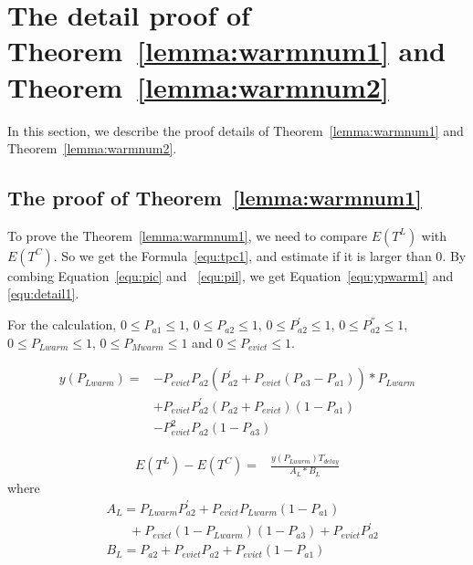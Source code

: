 \newpage
\section{The detail proof of Theorem~\ref{lemma:warmnum1} and Theorem~\ref{lemma:warmnum2}}
\label{appendixa}
In this section, we describe the proof details of Theorem~\ref{lemma:warmnum1} and Theorem~\ref{lemma:warmnum2}.


\subsection{The proof of Theorem~\ref{lemma:warmnum1}}
To prove the Theorem~\ref{lemma:warmnum1}, we need to compare $E(T^{L})$ with $E(T^{C})$.
So we get the Formula~\ref{equ:tpc1}, and estimate if it is larger than $0$.
By combing Equation~\ref{equ:pic} and ~\ref{equ:pil}, we get Equation~\ref{equ:ypwarm1} and \ref{equ:detail1}.

For the calculation, $0 \leq P_{a1} \leq 1$, $0 \leq P_{a2} \leq 1$, $0 \leq P_{a2}^{'} \leq 1$, $0 \leq P_{a2}^{''} \leq 1$, $0 \leq P_{Lwarm} \leq 1$, $0 \leq P_{Mwarm} \leq 1$
 and $0 \leq P_{evict} \leq 1$.

\begin{equation}
\label{equ:ypwarm1}
\begin{split}
y(P_{Lwarm}) =& -P_{evict}P_{a2}(P_{a2}^{'}+P_{evict}(P_{a3}-P_{a1}))*P_{Lwarm} \\
& +  P_{evict}P_{a2}^{'}(P_{a2}+P_{evict})(1-P_{a1})\\
& - P_{evict}^{2}P_{a2}(1-P_{a3}) \,
\end{split}\end{equation}

\begin{equation}
\label{equ:detail1}
\begin{split}
E(T^{L}) - E(T^{C}) = &\frac{y(P_{Lwarm})T_{delay}}{A_{L}*B_{L}}
\end{split}\end{equation}
where
\begin{equation*}
\begin{split}
&A_{L}=P_{Lwarm}P_{a2}^{'}+P_{evict}P_{Lwarm}(1-P_{a1}) \\ & \ \ \ \ \ \ \ \ + P_{evict}(1-P_{Lwarm})(1-P_{a3})+P_{evict}P_{a2}^{'}\\
&B_{L}=P_{a2}+P_{evict}P_{a2}+P_{evict}(1-P_{a1})
\end{split}\end{equation*}

